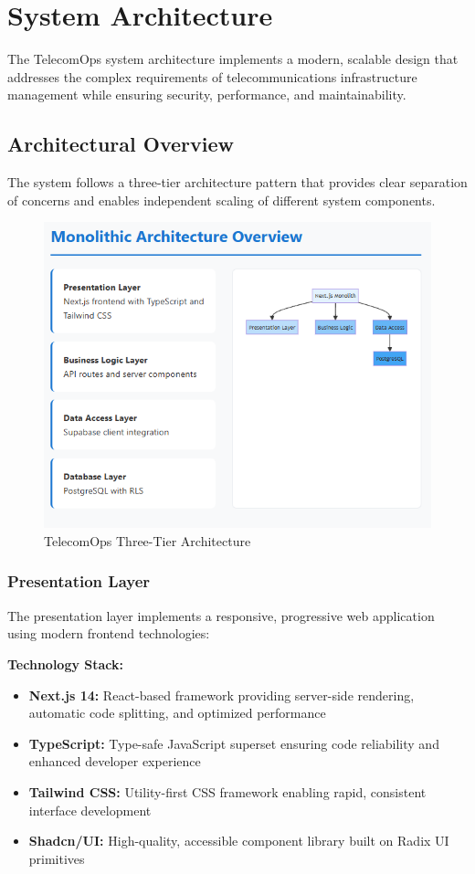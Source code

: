 \section{System Architecture}

The TelecomOps system architecture implements a modern, scalable design that addresses the complex requirements of telecommunications infrastructure management while ensuring security, performance, and maintainability.

\subsection{Architectural Overview}

The system follows a three-tier architecture pattern that provides clear separation of concerns and enables independent scaling of different system components.

\begin{figure}[H]
    \centering
    \includegraphics[width=0.9\linewidth]{img/chap_02/architecture_overview.png}
    \caption{TelecomOps Three-Tier Architecture}
    \label{fig:architecture_overview}
\end{figure}

\subsubsection{Presentation Layer}
The presentation layer implements a responsive, progressive web application using modern frontend technologies:

\textbf{Technology Stack:}
\begin{itemize}
\item \textbf{Next.js 14:} React-based framework providing server-side rendering, automatic code splitting, and optimized performance
\item \textbf{TypeScript:} Type-safe JavaScript superset ensuring code reliability and enhanced developer experience
\item \textbf{Tailwind CSS:} Utility-first CSS framework enabling rapid, consistent interface development
\item \textbf{Shadcn/UI:} High-quality, accessible component library built on Radix UI primitives
\end{itemize}

